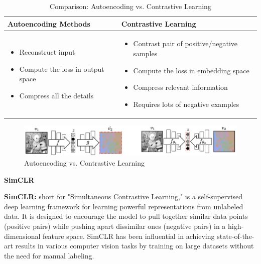\begin{table}[h!t]
\centering

\begin{tabular}{|p{8cm}|p{8cm}|}
\hline
\textbf{Autoencoding Methods} & \textbf{Contrastive Learning} \\
\hline
\begin{itemize}
  \item Reconstruct input
  \item Compute the loss in output space
  \item Compress all the details
\end{itemize}
&
\begin{itemize}
  \item Contrast pair of positive/negative samples
  \item Compute the loss in embedding space
  \item Compress relevant information
  \item Requires lots of negative examples
\end{itemize}
\\
\hline
\end{tabular}
\caption{Comparison: Autoencoding vs. Contrastive Learning}
\end{table}

\begin{figure}[h!t]
    \centering
    \includegraphics[width=1\linewidth]{autovscon.png}
    \caption{Autoencoding vs. Contrastive Learning}
    \label{fig:enter-label}
\end{figure}

\newpage

\textbf{SimCLR}

\begin{definition}
    \textbf{SimCLR:} short for "Simultaneous Contrastive Learning," is a self-supervised deep learning framework for learning powerful representations from unlabeled data. It is designed to encourage the model to pull together similar data points (positive pairs) while pushing apart dissimilar ones (negative pairs) in a high-dimensional feature space. SimCLR has been influential in achieving state-of-the-art results in various computer vision tasks by training on large datasets without the need for manual labeling.
\end{definition}

